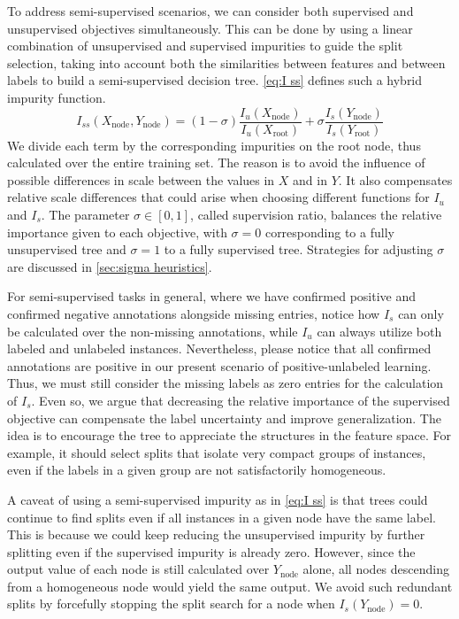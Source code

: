 To address semi-supervised scenarios, we can consider both supervised and unsupervised objectives simultaneously. This can be done by using a linear combination of unsupervised and supervised impurities to guide the split selection, taking into account both the similarities between features and between labels to build a semi-supervised decision tree.
\autoref{eq:I ss} defines such a hybrid impurity function.
%
\begin{equation}
    I_{ss}(X_\text{node}, Y_\text{node}) =
        (1 - \sigma) \frac{I_u(X_\text{node})}{I_u(X_\text{root})}
        + \sigma \frac{I_s(Y_\text{node})}{I_s(Y_\text{root})}
    \label{eq:I ss}
\end{equation}
%
We divide each term by the corresponding impurities on the root node, thus calculated over the entire training set. The reason is to avoid the influence of possible differences in scale between the values in $X$ and in $Y$. It also compensates relative scale differences that could arise when choosing different functions for $I_u$ and $I_s$.
%
The parameter $\sigma \in [0, 1]$, called supervision ratio,  %
balances the relative importance given to each objective, with $\sigma = 0$ corresponding to a fully unsupervised tree and $\sigma = 1$ to a fully supervised tree. Strategies for adjusting $\sigma$ are discussed in \autoref{sec:sigma heuristics}.

For semi-supervised tasks in general, where we have confirmed positive and confirmed negative annotations alongside missing entries, notice how $I_s$ can only be calculated over the non-missing annotations, while $I_u$ can always utilize both labeled and unlabeled instances.
%
Nevertheless, please notice that all confirmed annotations are positive in our present scenario of positive-unlabeled learning. Thus, we must still consider the missing labels as zero entries for the calculation of $I_s$. Even so, we argue 
that decreasing the relative importance of the supervised objective can compensate the label uncertainty and improve generalization. The idea is to encourage the tree to appreciate the structures in the feature space. For example, it should select splits that isolate very compact groups of instances, even if the labels in a given group are not satisfactorily homogeneous.

A caveat of using a semi-supervised impurity as in \autoref{eq:I ss} is that trees could continue to find splits even if all instances in a given node have the same label. This is because we could keep reducing the unsupervised impurity by further splitting even if the supervised impurity is already zero.
However, since the output value of each node is still calculated over $Y_\text{node}$ alone, all nodes descending from a homogeneous node would yield the same output. We avoid such redundant splits by forcefully stopping the split search for a node when $I_s(Y_\text{node})=0$.

